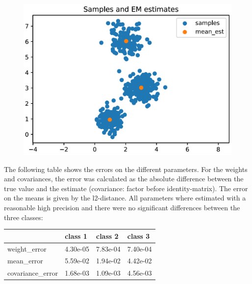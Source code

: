 \documentclass[DIV=12, ngerman, fontsize=12pt, parskip=half]{scrreprt}
\begin{document}
	\begin{figure}[H]
	\begin{center}
		\includegraphics[scale=0.4]{Task2_TestData_Mean_Est_png}
	\end{center}
	\end{figure}

	The following table shows the errors on the different parameters. For the weights and covariances, the error was calculated as the absolute difference between the true value and the estimate (covariance: factor before identity-matrix). The error on the means is given by the l2-distance. All parameters where estimated with a reasonable high precision and there were 
	no significant differences between the three classes:
	
	\begin{table}[H]
	\begin{center}	
		\begin{tabular}{|l|l|l|l|}
			\hline
			& class 1  & class 2  & class 3  \\ \hline
			weight\_error     & 4.30e-05 & 7.83e-04 & 7.40e-04 \\ \hline
			mean\_error       & 5.59e-02 & 1.94e-02 & 4.42e-02 \\ \hline
			covariance\_error & 1.68e-03 & 1.09e-03 & 4.56e-03 \\ \hline
		\end{tabular}
	\end{center}
	\end{table}
	
\end{document}

